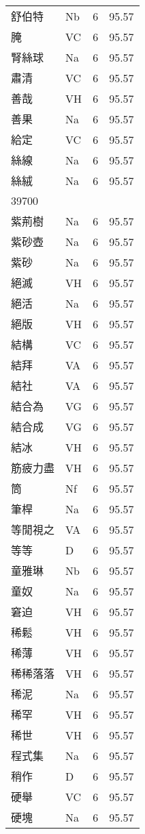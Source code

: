 \documentclass[twocolumn]{book}
\begin{document}
\begin{supertabular}{llrr}
舒伯特 & Nb & 6 &  95.57\\
腌 & VC & 6 &  95.57\\
腎絲球 & Na & 6 &  95.57\\
肅清 & VC & 6 &  95.57\\
善哉 & VH & 6 &  95.57\\
善果 & Na & 6 &  95.57\\
給定 & VC & 6 &  95.57\\
絲線 & Na & 6 &  95.57\\
絲絨 & Na & 6 &  95.57\\
39700\\
紫荊樹 & Na & 6 &  95.57\\
紫砂壺 & Na & 6 &  95.57\\
紫砂 & Na & 6 &  95.57\\
絕滅 & VH & 6 &  95.57\\
絕活 & Na & 6 &  95.57\\
絕版 & VH & 6 &  95.57\\
結構 & VC & 6 &  95.57\\
結拜 & VA & 6 &  95.57\\
結社 & VA & 6 &  95.57\\
結合為 & VG & 6 &  95.57\\
結合成 & VG & 6 &  95.57\\
結冰 & VH & 6 &  95.57\\
筋疲力盡 & VH & 6 &  95.57\\
筒 & Nf & 6 &  95.57\\
筆桿 & Na & 6 &  95.57\\
等閒視之 & VA & 6 &  95.57\\
等等 & D & 6 &  95.57\\
童雅琳 & Nb & 6 &  95.57\\
童奴 & Na & 6 &  95.57\\
窘迫 & VH & 6 &  95.57\\
稀鬆 & VH & 6 &  95.57\\
稀薄 & VH & 6 &  95.57\\
稀稀落落 & VH & 6 &  95.57\\
稀泥 & Na & 6 &  95.57\\
稀罕 & VH & 6 &  95.57\\
稀世 & VH & 6 &  95.57\\
程式集 & Na & 6 &  95.57\\
稍作 & D & 6 &  95.57\\
硬舉 & VC & 6 &  95.57\\
硬塊 & Na & 6 &  95.57\\

\end{supertabular}
\end{document}
